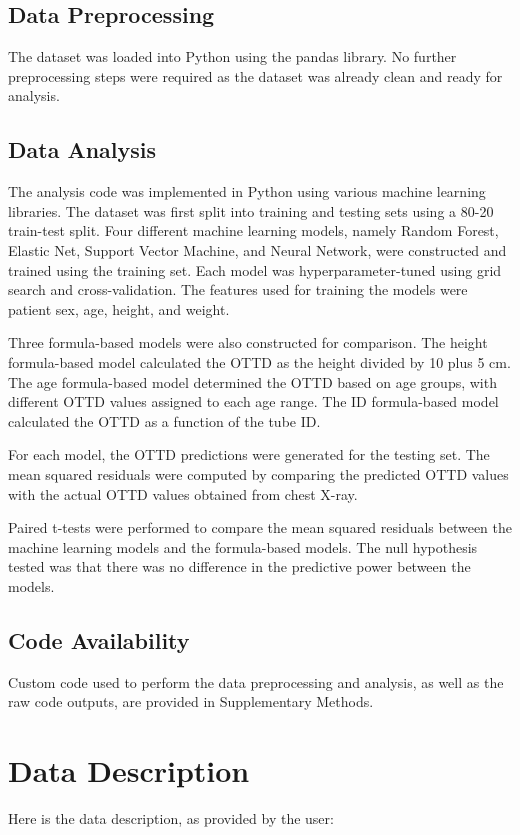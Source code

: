 \documentclass[11pt]{article}
\begin{document}
\subsection*{Data Preprocessing}
The dataset was loaded into Python using the pandas library. No further preprocessing steps were required as the dataset was already clean and ready for analysis.

\subsection*{Data Analysis}
The analysis code was implemented in Python using various machine learning libraries. The dataset was first split into training and testing sets using a 80-20 train-test split. Four different machine learning models, namely Random Forest, Elastic Net, Support Vector Machine, and Neural Network, were constructed and trained using the training set. Each model was hyperparameter-tuned using grid search and cross-validation. The features used for training the models were patient sex, age, height, and weight. 

Three formula-based models were also constructed for comparison. The height formula-based model calculated the OTTD as the height divided by 10 plus 5 cm. The age formula-based model determined the OTTD based on age groups, with different OTTD values assigned to each age range. The ID formula-based model calculated the OTTD as a function of the tube ID.

For each model, the OTTD predictions were generated for the testing set. The mean squared residuals were computed by comparing the predicted OTTD values with the actual OTTD values obtained from chest X-ray. 

Paired t-tests were performed to compare the mean squared residuals between the machine learning models and the formula-based models. The null hypothesis tested was that there was no difference in the predictive power between the models.\subsection*{Code Availability}

Custom code used to perform the data preprocessing and analysis, as well as the raw code outputs, are provided in Supplementary Methods.


\clearpage
\appendix

\section{Data Description} \label{sec:data_description} Here is the data description, as provided by the user:
\end{document}
